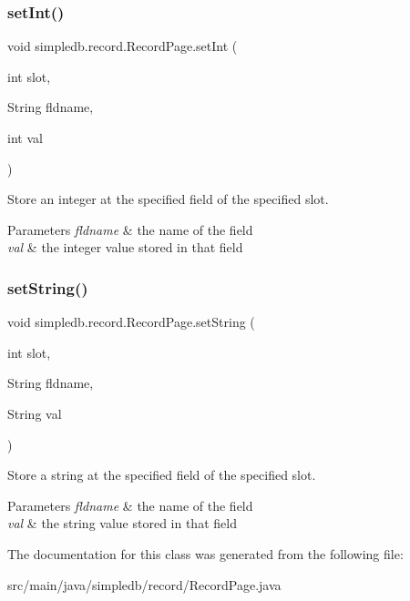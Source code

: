 \subsubsection{\texorpdfstring{set\+Int()}{setInt()}}
{\footnotesize\ttfamily void simpledb.\+record.\+Record\+Page.\+set\+Int (\begin{DoxyParamCaption}\item[{int}]{slot,  }\item[{String}]{fldname,  }\item[{int}]{val }\end{DoxyParamCaption})\hspace{0.3cm}{\ttfamily [inline]}}

Store an integer at the specified field of the specified slot. 
\begin{DoxyParams}{Parameters}
{\em fldname} & the name of the field \\
\hline
{\em val} & the integer value stored in that field \\
\hline
\end{DoxyParams}
\mbox{\label{classsimpledb_1_1record_1_1RecordPage_ad464ee57a318a8a8044fb2258d49058f}} 
\subsubsection{\texorpdfstring{set\+String()}{setString()}}
{\footnotesize\ttfamily void simpledb.\+record.\+Record\+Page.\+set\+String (\begin{DoxyParamCaption}\item[{int}]{slot,  }\item[{String}]{fldname,  }\item[{String}]{val }\end{DoxyParamCaption})\hspace{0.3cm}{\ttfamily [inline]}}

Store a string at the specified field of the specified slot. 
\begin{DoxyParams}{Parameters}
{\em fldname} & the name of the field \\
\hline
{\em val} & the string value stored in that field \\
\hline
\end{DoxyParams}


The documentation for this class was generated from the following file\+:\begin{DoxyCompactItemize}
\item 
src/main/java/simpledb/record/Record\+Page.\+java\end{DoxyCompactItemize}
